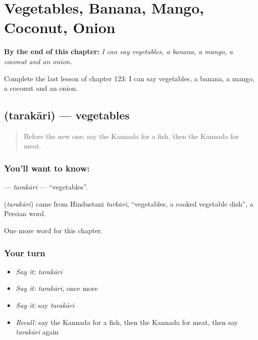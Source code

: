 
\chapter{Vegetables, Banana, Mango, Coconut, Onion}
\label{ch:ka-vegetables-banana-mango-coconut-onion}

\begin{chapteropening}
\textbf{By the end of this chapter:} \emph{I can say vegetables, a banana, a mango, a coconut and an onion.}

Complete the last lesson of chapter 123: I can say vegetables, a banana, a mango, a coconut and an onion.
\end{chapteropening}

\section[\texorpdfstring{\kn{ತರಕಾರಿ} (tarakāri)}{ತರಕಾರಿ (tarakāri)}]{ (tarakāri) — vegetables}

\label{lesson:KA-C123-tarakari}



\begin{quote}
Before the new one: say the Kannada for a fish, then the Kannada for meat.
\end{quote}

\subsection*{You'll want to know: }
\textbf{} — \emph{tarakāri} — \textquotedblleft{}vegetables\textquotedblright{}.

\begin{cousinweb}
\textbf{} (\emph{tarakāri}) came from Hindustani \emph{tarkārī}, \textquotedblleft{}vegetables, a cooked vegetable dish\textquotedblright{}, a Persian word.
\end{cousinweb}

\begin{grammarlens}[title={What you've built}]
One more word for this chapter.
\end{grammarlens}

\subsection*{Your turn}
\begin{itemize}
\raggedright
  \item \emph{Say it:} \emph{tarakāri}
  \item \emph{Say it:} \emph{tarakāri}, once more
  \item \emph{Say it:} say \emph{tarakāri}
  \item \emph{Recall:} say the Kannada for a fish, then the Kannada for meat, then say \emph{tarakāri} again
\end{itemize}

